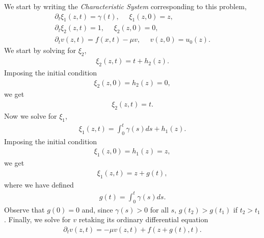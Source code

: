 \begin{questions}

\begin{solution}
We start by writing the \textit{Characteristic System} corresponding to this problem,
\begin{align*}
\partial_t\xi_1(z,t)=\gamma(t),~~~~~~\xi_1(z,0)=z,\\
\partial_t\xi_2(z,t)=1,~~~~~~\xi_2(z,0)=0,\\
\partial_tv(z,t)=f(x,t)-\mu v,~~~~~~v(z,0)=u_0(z).
\end{align*}
We start by solving for $\xi_2$,
\begin{align*}
\xi_2(z,t)=t+h_2(z).
\end{align*}
Imposing the initial condition
\begin{align*}
\xi_2(z,0)=h_2(z)=0,
\end{align*}
we get
\begin{align*}
\xi_2(z,t)=t.
\end{align*}
Now we solve for $\xi_1$,
\begin{align*}
\xi_1(z,t)=\int_0^t\gamma(s)ds+h_1(z).
\end{align*}
Imposing the initial condition
\begin{align*}
\xi_1(z,0)=h_1(z)=z,
\end{align*}
we get
\begin{align*}
\xi_1(z,t)=z+g(t),
\end{align*}
where we have defined
\begin{align*}
g(t)=\int_0^t\gamma(s)ds.
\end{align*}
Observe that $g(0)=0$ and, since $\gamma(s)>0$ for all $s$, $g(t_2)>g(t_1)$ if $t_2>t_1$. Finally, we solve for $v$ retaking its ordinary differential equation
\begin{align*}
\partial_tv(z,t)=-\mu v(z,t)+f(z+g(t),t).

\end{align*}
\end{solution}
\end{questions}
